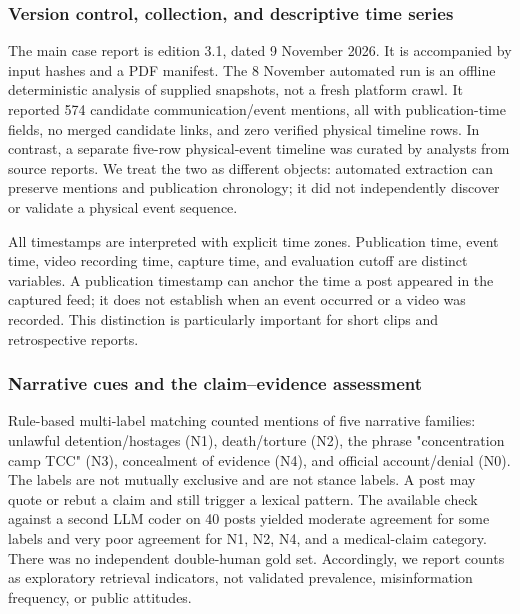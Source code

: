 \subsubsection{Version control, collection, and descriptive time series}

The main case report is edition 3.1, dated 9 November 2026. It is accompanied by input hashes and a PDF manifest. The 8 November automated run is an offline deterministic analysis of supplied snapshots, not a fresh platform crawl. It reported 574 candidate communication/event mentions, all with publication-time fields, no merged candidate links, and zero verified physical timeline rows. In contrast, a separate five-row physical-event timeline was curated by analysts from source reports. We treat the two as different objects: automated extraction can preserve mentions and publication chronology; it did not independently discover or validate a physical event sequence.

All timestamps are interpreted with explicit time zones. Publication time, event time, video recording time, capture time, and evaluation cutoff are distinct variables. A publication timestamp can anchor the time a post appeared in the captured feed; it does not establish when an event occurred or a video was recorded. This distinction is particularly important for short clips and retrospective reports.

\subsubsection{Narrative cues and the claim--evidence assessment}

Rule-based multi-label matching counted mentions of five narrative families: unlawful detention/hostages (N1), death/torture (N2), the phrase "concentration camp TCC" (N3), concealment of evidence (N4), and official account/denial (N0). The labels are not mutually exclusive and are not stance labels. A post may quote or rebut a claim and still trigger a lexical pattern. The available check against a second LLM coder on 40 posts yielded moderate agreement for some labels and very poor agreement for N1, N2, N4, and a medical-claim category. There was no independent double-human gold set. Accordingly, we report counts as exploratory retrieval indicators, not validated prevalence, misinformation frequency, or public attitudes.

